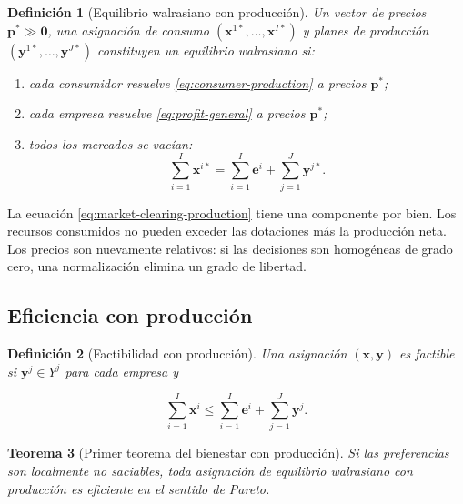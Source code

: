 \documentclass[12pt]{article}
\theoremstyle{cideplain}
\newtheorem{theorem}{Teorema}[section]
\theoremstyle{cidedef}
\newtheorem{definition}[theorem]{Definición}
\newcommand{\p}{\mathbf{p}}
\newcommand{\e}{\bm e}
\newcommand{\x}{\mathbf{x}}
\newcommand{\y}{\mathbf{y}}
\begin{document}
\begin{definition}[Equilibrio walrasiano con producción]
Un vector de precios \(\p^*\gg\bm 0\), una asignación de consumo
\((\x^{1*},\ldots,\x^{I*})\) y planes de producción
\((\y^{1*},\ldots,\y^{J*})\) constituyen un equilibrio walrasiano si:

\begin{enumerate}
  \item cada consumidor resuelve \eqref{eq:consumer-production} a precios \(\p^*\);
  \item cada empresa resuelve \eqref{eq:profit-general} a precios \(\p^*\);
  \item todos los mercados se vacían:
  \begin{equation}
    \sum_{i=1}^I\x^{i*}
    =\sum_{i=1}^I\e^i+\sum_{j=1}^J\y^{j*}.
    \label{eq:market-clearing-production}
  \end{equation}
\end{enumerate}
\end{definition}

La ecuación \eqref{eq:market-clearing-production} tiene una componente por bien. Los
recursos consumidos no pueden exceder las dotaciones más la producción neta. Los precios
son nuevamente relativos: si las decisiones son homogéneas de grado cero, una
normalización elimina un grado de libertad.

\subsection{Eficiencia con producción}

\begin{definition}[Factibilidad con producción]
Una asignación \((\x,\y)\) es factible si \(\y^j\in Y^j\) para cada empresa y

\[
  \sum_{i=1}^I\x^i
  \leq\sum_{i=1}^I\e^i+\sum_{j=1}^J\y^j.
\]
\end{definition}

\begin{theorem}[Primer teorema del bienestar con producción]
Si las preferencias son localmente no saciables, toda asignación de equilibrio walrasiano
con producción es eficiente en el sentido de Pareto.
\end{theorem}
\end{document}
